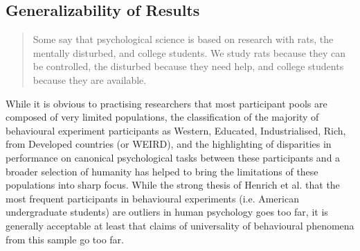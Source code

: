 \documentclass[12pt,a4paper,titlepage]{scrreprt}
\begin{document}
\subsection{Generalizability of Results}
\begin{quote}Some say that psychological science is based on research with rats, the mentally disturbed, and college students. We study rats because they can be controlled, the disturbed because they need help, and college students because they are available.\cite{birnbaum_psychological_2000}
\end{quote}
While it is obvious to practising researchers that most participant pools are composed of very limited populations\cite{buchanan_using_1999,birnbaum_psychological_2000,kraut_psychological_2004,birnbaum_human_2004,buhrmester_amazons_2011}, the classification of the majority of behavioural experiment participants as Western, Educated, Industrialised, Rich, from Developed countries (or WEIRD), and the highlighting of disparities in performance on canonical psychological tasks between these participants and a broader selection of humanity \cite{henrich_beyond_2010} has helped to bring the limitations of these populations into sharp focus. While the strong thesis of Henrich et al. that the most frequent participants in behavioural experiments (i.e. American undergraduate students) are outliers in human psychology goes too far\cite{bennis_weirdness_2010}, it is generally acceptable at least that claims of universality of behavioural phenomena from this sample go too far\cite{baumard_weird_2010,ceci_weird_2010,konecni_responsible_2010}.
\end{document}
